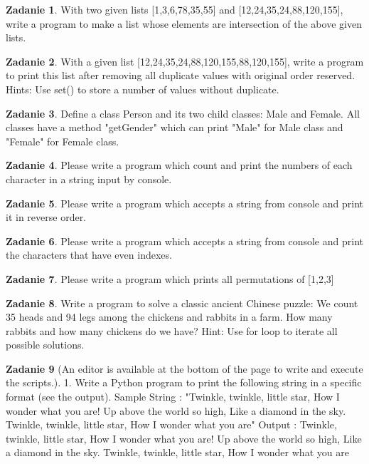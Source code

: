 \documentclass[11pt]{article}
\theoremstyle{definition}
\newtheorem{zadanie}{Zadanie}
\begin{document}
\begin{zadanie}
With two given lists [1,3,6,78,35,55] and [12,24,35,24,88,120,155], write a program to make a list whose elements are intersection of the above given lists.

\end{zadanie}

\begin{zadanie}
With a given list [12,24,35,24,88,120,155,88,120,155], write a program to print this list after removing all duplicate values with original order reserved.
Hints:
Use set() to store a number of values without duplicate.

\end{zadanie}

\begin{zadanie}
Define a class Person and its two child classes: Male and Female. All classes have a method "getGender" which can print "Male" for Male class and "Female" for Female class.

\end{zadanie}

\begin{zadanie}
Please write a program which count and print the numbers of each character in a string input by console.

\end{zadanie}

\begin{zadanie}
Please write a program which accepts a string from console and print it in reverse order.

\end{zadanie}

\begin{zadanie}
Please write a program which accepts a string from console and print the characters that have even indexes.

\end{zadanie}

\begin{zadanie}
Please write a program which prints all permutations of [1,2,3]

\end{zadanie}

\begin{zadanie}
Write a program to solve a classic ancient Chinese puzzle:
We count 35 heads and 94 legs among the chickens and rabbits in a farm. How many rabbits and how many chickens do we have?
Hint:
Use for loop to iterate all possible solutions.

\end{zadanie}
\begin{zadanie}
[An editor is available at the bottom of the page to write and execute the scripts.]
1. Write a Python program to print the following string in a specific format (see the output).
Sample String : "Twinkle, twinkle, little star, How I wonder what you are! Up above the world so high, Like a diamond in the sky. Twinkle, twinkle, little star, How I wonder what you are" Output :
Twinkle, twinkle, little star,
How I wonder what you are!
Up above the world so high,
Like a diamond in the sky.
Twinkle, twinkle, little star,
How I wonder what you are
\end{zadanie}
\end{document}
